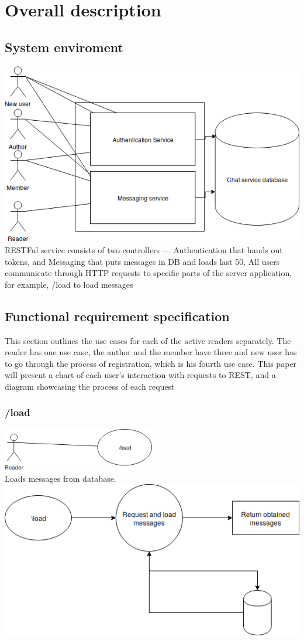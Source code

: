 \documentclass[12pt]{article}
\begin{document}
	\section{Overall description}
	\subsection{System enviroment}
	\includegraphics[width=\textwidth]{SystemEnviroment.png}
	RESTFul service consists of two controllers --- Authentication that hands out tokens, and Messaging that puts messages in DB and loads last 50. All users communicate through HTTP requests to specific parts of the server application, for example, /load to load messages
	\subsection{Functional requirement specification}
	This section outlines the use cases for each of the active readers separately. The reader has one use case, the author and the member have three and new user has to go through the process of registration, which is his fourth use case. This paper will present a chart of each user's interaction with requests to REST, and a diagram showcasing the process of each request
	\subsubsection{/load}
	\includegraphics[width=0.5\textwidth]{Reader.png} \\
	Loads messages from database.\\
	\includegraphics[width=\textwidth]{loadDiagram.png}
\end{document}
